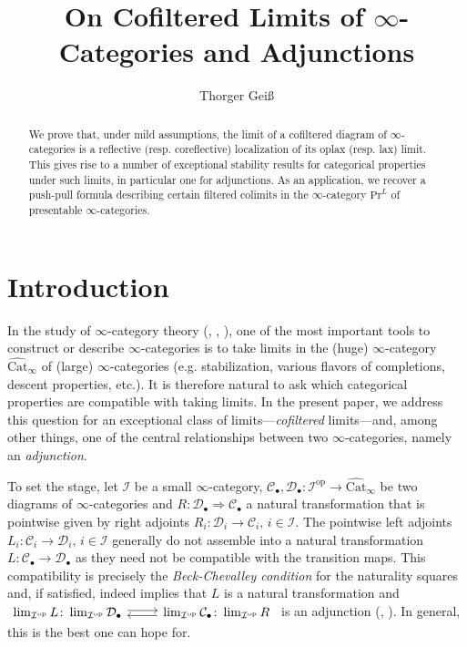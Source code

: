 \documentclass[a4paper,reqno,10pt]{amsart}
\title{On Cofiltered Limits of $\infty$-Categories and Adjunctions}
\author{Thorger Gei\ss}
\theoremstyle{definition}
\theoremstyle{remark}
\newcommand{\C}{\mathcal{C}}
\newcommand{\D}{\mathcal{D}}
\newcommand{\I}{\mathcal{I}}
\newcommand{\Cat}{\mathrm{Cat}}
\renewcommand{\Pr}{\mathrm{Pr}}
\newcommand{\op}{\mathrm{op}}
\newcommand{\singlequote}[1]{\textquotesingle #1\textquotesingle}
\newcommand{\Adj}{\arrow[r,shift left=0.2em]\arrow[r,leftarrow,shift right=0.2em]}
\begin{document}
\begin{abstract}
We prove that, under mild assumptions, the limit of a cofiltered diagram of $\infty$-categories is a reflective (resp. coreflective) localization of its oplax (resp. lax) limit. This gives rise to a number of exceptional \singlequote{stability} results for categorical properties under such limits, in particular one for adjunctions. As an application, we recover a push-pull formula describing certain filtered colimits in the $\infty$-category $\Pr^L$ of presentable $\infty$-categories.
\end{abstract}

\setcounter{tocdepth}{1}

\begingroup\parskip=0pt
\maketitle
\tableofcontents
\endgroup

\section{Introduction}

In the study of $\infty$-category theory (\cite{Joyal}, \cite{HTT}, \cite{HA}), one of the most important tools to construct or describe $\infty$-categories is to take limits in the (huge) $\infty$-category $\widehat{\Cat}_{\infty}$ of (large) $\infty$-categories (e.g. stabilization, various flavors of completions, descent properties, etc.). It is therefore natural to ask which categorical properties are compatible with taking limits. In the present paper, we address this question for an exceptional class of limits—\textit{cofiltered} limits—and, among other things, one of the central relationships between two $\infty$-categories, namely an \textit{adjunction}.

To set the stage, let $\I$ be a small $\infty$-category, $\C_{\bullet},\D_{\bullet}\colon\I^{\op}\rightarrow\widehat{\Cat}_{\infty}$ be two diagrams of $\infty$-categories and $R\colon\D_{\bullet}\Rightarrow\C_{\bullet}$ a natural transformation that is pointwise given by right adjoints $R_i\colon\D_i\rightarrow\C_i,\,i\in\I$. The pointwise left adjoints $L_i\colon\C_i\rightarrow\D_i,\,i\in\I$ generally do not assemble into a natural transformation $L\colon\C_{\bullet}\rightarrow\D_{\bullet}$ as they need not be compatible with the transition maps. This compatibility is precisely the \textit{Beck-Chevalley condition} for the naturality squares and, if satisfied, indeed implies that $L$ is a natural transformation and $\begin{tikzcd}\lim_{\I^{\op}}L\colon\lim_{\I^{\op}}\D_{\bullet}\Adj & \lim_{\I^{\op}}\C_{\bullet}\colon\lim_{\I^{\op}}R\end{tikzcd}$ is an adjunction (\cite[Proposition 5.1]{HorevYanovski}, \cite[Lemma 3.19]{Linskens}). In general, this is the best one can hope for.
\end{document}
